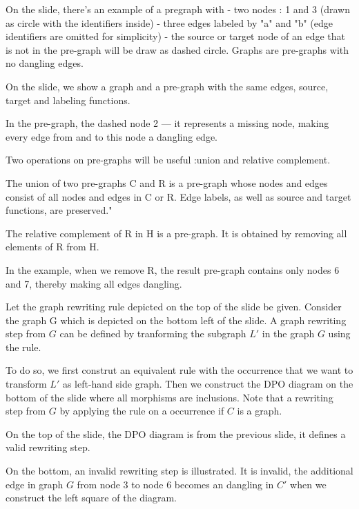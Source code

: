 On the slide, there's an example of a pregraph with
    - two nodes : 1 and 3 (drawn as circle with the identifiers inside)
    - three edges labeled by "a" and "b" (edge identifiers are omitted for simplicity)
    - the source or target node of an edge that is not in the pre-graph will be draw as dashed circle.
Graphs are pre-graphs with no dangling edges. 

On the slide, we show a graph and a pre-graph with the same edges, source, target and labeling functions.

In the pre-graph, the dashed node 2 — it represents a missing node, making every edge from and to this node a dangling edge.

Two operations on pre-graphs will be useful :union and relative complement. 

The union of two pre-graphs C and R is a pre-graph whose nodes and edges consist of all nodes and edges in C or R. Edge labels, as well as source and target functions, are preserved."

The relative complement of R in H is a pre-graph. It is obtained by removing all elements of R from H. 

In the example, when we remove R, the result pre-graph contains only nodes 6 and 7, thereby making all edges dangling.




Let the graph rewriting rule depicted on the top of the slide be given. Consider the graph G which is depicted on the bottom left of the slide. 
A graph rewriting step from $G$ can be defined by tranforming the subgraph $L'$ in the graph $G$ using the rule.

To do so, we first construt an equivalent rule with the occurrence that we want to transform $L'$ as left-hand side graph. Then we construct the DPO diagram on the bottom of the slide where all morphisms are inclusions. Note that a rewriting step from $G$ by applying the rule on a occurrence if $C$ is a graph.


On the top of the slide, the DPO diagram is from the previous slide, it defines a valid rewriting step.

On the bottom, an invalid rewriting step is illustrated. It is invalid, the additional edge in graph $G$ from node 3 to node 6 becomes an dangling in $C'$ when we construct the left square of the diagram.


